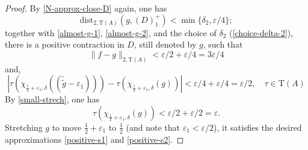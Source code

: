 \documentclass[12pt, oneside, psamsfonts]{amsart}
\theoremstyle{definition}
\theoremstyle{remark}
\numberwithin{equation}{section}
\newcommand{\norm}[1]{\| #1\|}
\newcommand{\abs}[1]{| #1 |}
\newcommand{\eps}{\varepsilon}
\newcommand{\tr}{\mathrm{T}}
\begin{document}
\begin{proof}
By \ref{N-approx-close-D} again, one has
$$\mathrm{dist}_{2, \tr(A)}(g, (D)_1^+) < \min\{\delta_2, \eps/4\};$$
together with \eqref{almost-g-1}, \eqref{almost-g-2}, and the choice of $\delta_2$ (\eqref{choice-delta-2}),
there is a positive contraction in $D$, still denoted by $g$, such that 
$$\norm{f - g }_{2, \tr(A)} < \eps/2 + \eps/4 = 3\eps/4$$ 
and,
$$ \abs{ \tau(\chi_{\frac{1}{2}+\eps_1, \delta}((\tilde{\tilde{g}} - \eps_1))) - \tau(\chi_{\frac{1}{2}+\eps_1, \delta}(g))} < \eps/4 + \eps/4 = \eps/2,\quad \tau\in \tr(A) $$
By \eqref{small-strech}, one has
$$ \tau(\chi_{\frac{1}{2}+\eps_1, \delta}(g)) <\eps/2 + \eps/2 = \eps.$$
Stretching $g$ to move $\frac{1}{2} + \eps_1$ to $\frac{1}{2}$ (and note that $\eps_1< \eps/2$), it satisfies the desired approximations \eqref{positive-s1} and \eqref{positive-s2}.
% 
%
%
%

\end{proof}
\end{document}
